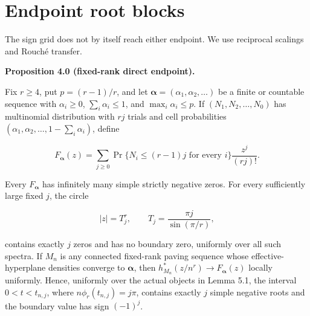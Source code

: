 \documentclass[10pt]{article}
\newenvironment{mdstatement}[1]
  {\par\Needspace{0.16\textheight}\noindent\textbf{#1.}\ \itshape}
  {\par\normalfont}
\begin{document}
\section{Endpoint root blocks}


The sign grid does not by itself reach either endpoint.  We use reciprocal
scalings and Rouché transfer.

\begin{mdstatement}{Proposition 4.0 (fixed-rank direct endpoint)}


Fix $r\ge4$, put $p=(r-1)/r$, and let
$\boldsymbol\alpha=(\alpha_1,\alpha_2,\ldots)$ be a finite or countable
sequence with $\alpha_i\ge0$, $\sum_i\alpha_i\le1$, and
$\max_i\alpha_i\le p$.  If
$(N_1,N_2,\ldots,N_0)$ has multinomial distribution with $rj$ trials and
cell probabilities $(\alpha_1,\alpha_2,\ldots,1-\sum_i\alpha_i)$, define

\[
 F_{\boldsymbol\alpha}(z)=\sum_{j\ge0}
 \Pr\{N_i\le(r-1)j\text{ for every }i\}\frac{z^j}{(rj)!}. \tag{4.0}
\]

Every $F_{\boldsymbol\alpha}$ has infinitely many simple strictly negative
zeros.  For every sufficiently large fixed $j$, the circle

\[
 |z|=T_j^r,\qquad T_j=\frac{\pi j}{\sin(\pi/r)}, \tag{4.0a}
\]

contains exactly $j$ zeros and has no boundary zero, uniformly over all
such spectra.  If $M_n$ is any connected fixed-rank paving sequence whose
effective-hyperplane densities converge to $\boldsymbol\alpha$, then
$h_{M_n}^*(z/n^r)\to F_{\boldsymbol\alpha}(z)$ locally uniformly.  Hence,
uniformly over the actual objects in Lemma 5.1, the interval
$0<t<t_{n,j}$, where $n\phi_r(t_{n,j})=j\pi$, contains exactly $j$
simple negative roots and the boundary value has sign $(-1)^j$.

\end{mdstatement}
\end{document}

